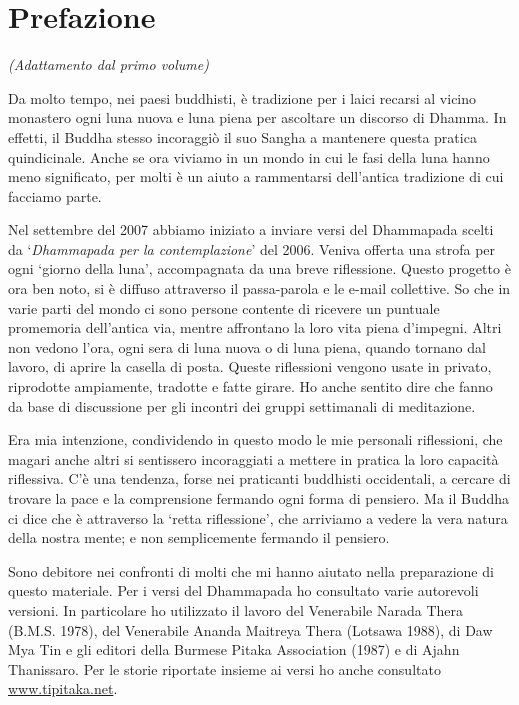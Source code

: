 \chapter{Prefazione}

{\centering
\emph{(Adattamento dal primo volume)}
\par}

\bigskip

\noindent
Da molto tempo, nei paesi buddhisti, è tradizione per i laici recarsi al
vicino monastero ogni luna nuova e luna piena per ascoltare un discorso
di Dhamma. In effetti, il Buddha stesso incoraggiò il suo Sangha a
mantenere questa pratica quindicinale. Anche se ora viviamo in un mondo
in cui le fasi della luna hanno meno significato, per molti è un aiuto a
rammentarsi dell'antica tradizione di cui facciamo parte.

Nel settembre del 2007 abbiamo iniziato a inviare versi del Dhammapada
scelti da `\emph{Dhammapada per la contemplazione}' del 2006. Veniva
offerta una strofa per ogni `giorno della luna', accompagnata da una
breve riflessione. Questo progetto è ora ben noto, si è diffuso
attraverso il passa-parola e le e-mail collettive. So che in varie parti
del mondo ci sono persone contente di ricevere un puntuale promemoria
dell'antica via, mentre affrontano la loro vita piena d'impegni. Altri
non vedono l'ora, ogni sera di luna nuova o di luna piena, quando
tornano dal lavoro, di aprire la casella di posta. Queste riflessioni
vengono usate in privato, riprodotte ampiamente, tradotte e fatte
girare. Ho anche sentito dire che fanno da base di discussione per gli
incontri dei gruppi settimanali di meditazione.

Era mia intenzione, condividendo in questo modo le mie personali
riflessioni, che magari anche altri si sentissero incoraggiati a mettere
in pratica la loro capacità riflessiva. C'è una tendenza, forse nei
praticanti buddhisti occidentali, a cercare di trovare la pace e la
comprensione fermando ogni forma di pensiero. Ma il Buddha ci dice che è
attraverso la `retta riflessione', che arriviamo a vedere la vera natura
della nostra mente; e non semplicemente fermando il pensiero.

Sono debitore nei confronti di molti che mi hanno aiutato nella
preparazione di questo materiale. Per i versi del Dhammapada ho
consultato varie autorevoli versioni. In particolare ho utilizzato il
lavoro del Venerabile Narada Thera (B.M.S. 1978), del Venerabile Ananda
Maitreya Thera (Lotsawa 1988), di Daw Mya Tin e gli editori della
Burmese Pitaka Association (1987) e di Ajahn Thanissaro. Per le storie
riportate insieme ai versi ho anche consultato
\href{http://www.tipitaka.net/}{www.tipitaka.net}.

